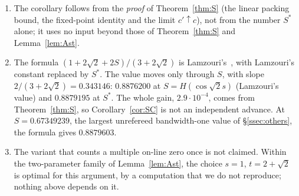 \begin{remark}\label{rem:SC}
\begin{enumerate}[label=(\roman*)]
\item The corollary follows from the \emph{proof} of Theorem~\ref{thm:S} (the linear packing bound, the fixed-point identity and the limit
$c'\uparrow c$), not from the number $S^*$ alone; it uses no input beyond those of Theorem~\ref{thm:S} and Lemma~\ref{lem:Ast}.
\item The formula $(1+2\sqrt2+2S)/(3+2\sqrt2)$ is Lamzouri's~\cite{Lamzouri}, with Lamzouri's constant replaced by $S^*$. The value moves only through $S$,
with slope $2/(3+2\sqrt2)=0.343146$: $0.8876200$ at $S=H(\cos\sqrt2s)$ (Lamzouri's value) and $0.8879195$ at $S^*$. The whole gain,
$2.9\cdot10^{-4}$, comes from Theorem~\ref{thm:S}, so Corollary~\ref{cor:SC} is not an independent advance. At $S=0.67349239$, the largest
unrefereed bandwidth-one value of \S\ref{ssec:others}, the formula gives $0.8879603$.
\item The variant that counts a multiple on-line zero once is not claimed. Within the two-parameter family of Lemma~\ref{lem:Ast}, the choice
$s=1$, $t=2+\sqrt2$ is optimal for this argument, by a computation that we do not reproduce; nothing
above depends on it.
\end{enumerate}
\end{remark}

